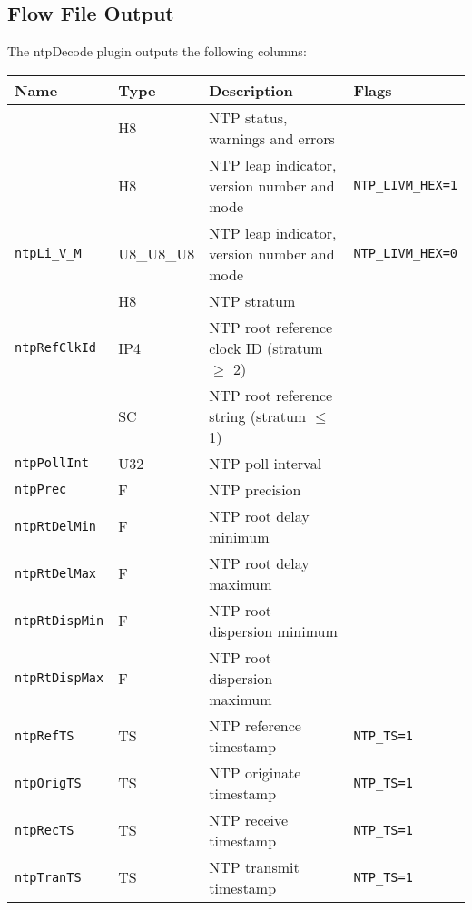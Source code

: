 \documentclass[documentation]{subfiles}
\begin{document}
\subsection{Flow File Output}
The ntpDecode plugin outputs the following columns:
\begin{longtable}{llll}
    \toprule
    {\bf Name} & {\bf Type} & {\bf Description} & {\bf Flags}\\
    \midrule\endhead%
    {\tt \nameref{ntpStat}} & H8 & NTP status, warnings and errors \\
    {\tt \nameref{ntpLiVM}} & H8 & NTP leap indicator, version number and mode & {\tt NTP\_LIVM\_HEX=1}\\
    {\tt \hyperref[ntpLiVM]{ntpLi\_V\_M}} & U8\_U8\_U8 & NTP leap indicator, version number and mode & {\tt NTP\_LIVM\_HEX=0}\\
    {\tt \nameref{ntpStrat}} & H8 & NTP stratum \\
    {\tt ntpRefClkId} & IP4 & NTP root reference clock ID (stratum $\geq$ 2)\\
    {\tt \nameref{ntpRefStrId}} & SC & NTP root reference string (stratum $\leq$ 1)\\
    {\tt ntpPollInt} & U32 & NTP poll interval \\

    {\tt ntpPrec}      & F & NTP precision \\
    {\tt ntpRtDelMin}  & F & NTP root delay minimum \\
    {\tt ntpRtDelMax}  & F & NTP root delay maximum \\
    {\tt ntpRtDispMin} & F & NTP root dispersion minimum \\
    {\tt ntpRtDispMax} & F & NTP root dispersion maximum \\

    {\tt ntpRefTS}  & TS & NTP reference timestamp & {\tt NTP\_TS=1}\\
    {\tt ntpOrigTS} & TS & NTP originate timestamp & {\tt NTP\_TS=1}\\
    {\tt ntpRecTS}  & TS & NTP receive timestamp   & {\tt NTP\_TS=1}\\
    {\tt ntpTranTS} & TS & NTP transmit timestamp  & {\tt NTP\_TS=1}\\
    \bottomrule
\end{longtable}
\end{document}
